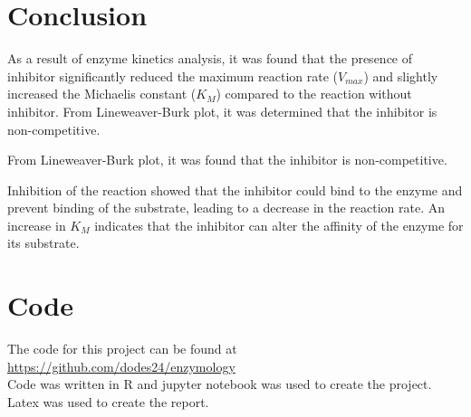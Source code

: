 \documentclass{article}
\begin{document}
\section{Conclusion}
As a result of enzyme kinetics analysis, it was found that the presence of inhibitor
 significantly reduced the maximum reaction rate ($V_{max}$) and slightly increased 
 the Michaelis constant ($K_M$) compared to the reaction without inhibitor.
 From Lineweaver-Burk plot, it was determined that the inhibitor is non-competitive.

 From Lineweaver-Burk plot, it was found that the inhibitor is non-competitive.

Inhibition of the reaction showed that the inhibitor could bind to the enzyme and 
prevent binding of the substrate, leading to a decrease in the reaction rate. 
An increase in $K_M$ indicates that the inhibitor can alter the affinity of the 
enzyme for its substrate.


\section{Code}
The code for this project can be found at \url{https://github.com/dodes24/enzymology}\\
Code was written in R and jupyter notebook was used to create the project.\\
Latex was used to create the report.
\end{document}
